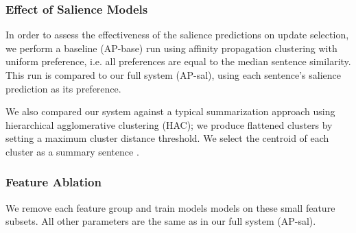\subsubsection{Effect of Salience Models}

In order to assess the effectiveness of the salience predictions on update
selection, we perform a baseline (AP-base) run using affinity propagation 
clustering
with uniform preference, i.e. all preferences are equal to the median sentence
similarity. This run is compared to our full system (AP-sal), using each
sentence's salience prediction as its preference. 



We also compared our system against a typical summarization approach using
hierarchical agglomerative clustering (HAC); we produce flattened clusters by setting a maximum cluster 
distance threshold. We  select the centroid of each
cluster as a summary sentence  \cite{??}. 

\subsubsection{Feature Ablation}

We remove each feature group and train models models on these small 
feature subsets. All other parameters are the same as in our full system 
(AP-sal).




